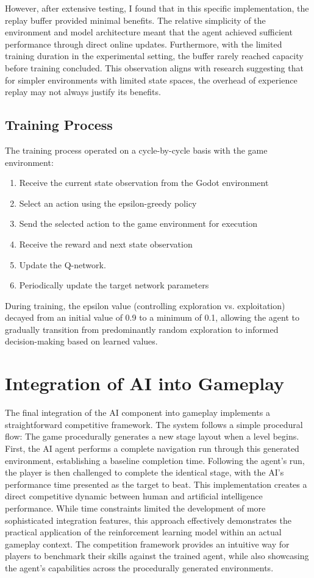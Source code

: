 However, after extensive testing, I found that in this specific implementation, the replay buffer provided minimal benefits. 
The relative simplicity of the environment and model architecture meant that the agent achieved sufficient performance through direct online updates. 
Furthermore, with the limited training duration in the experimental setting, the buffer rarely reached capacity before training concluded. 
This observation aligns with research suggesting that for simpler environments with limited state spaces, the overhead of experience replay may not always justify its benefits.

\subsection{Training Process}

The training process operated on a cycle-by-cycle basis with the game environment:

\begin{enumerate}
    \item Receive the current state observation from the Godot environment
    \item Select an action using the epsilon-greedy policy
    \item Send the selected action to the game environment for execution
    \item Receive the reward and next state observation
    \item Update the Q-network.
    \item Periodically update the target network parameters
\end{enumerate}

During training, the epsilon value (controlling exploration vs. exploitation) decayed from an initial value of 0.9 to a minimum of 0.1, 
allowing the agent to gradually transition from predominantly random exploration to informed decision-making based on learned values.

\section{Integration of AI into Gameplay}

The final integration of the AI component into gameplay implements a straightforward competitive framework. The system follows a simple procedural flow:
The game procedurally generates a new stage layout when a level begins. 
First, the AI agent performs a complete navigation run through this generated environment, establishing a baseline completion time. 
Following the agent's run, the player is then challenged to complete the identical stage, with the AI's performance time presented as the target to beat. 
This implementation creates a direct competitive dynamic between human and artificial intelligence performance. 
While time constraints limited the development of more sophisticated integration features, this approach effectively demonstrates the practical application of the reinforcement learning model within an actual gameplay context.
The competition framework provides an intuitive way for players to benchmark their skills against the trained agent, while also showcasing the agent's capabilities across the procedurally generated environments.
